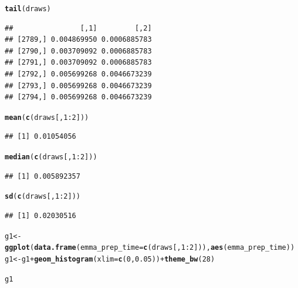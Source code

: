 \documentclass{article}\usepackage[]{graphicx}\usepackage[]{color}
\makeatletter
\newcommand{\hlnum}[1]{\textcolor[rgb]{0.686,0.059,0.569}{#1}}%
\newcommand{\hlopt}[1]{\textcolor[rgb]{0,0,0}{#1}}%
\newcommand{\hlstd}[1]{\textcolor[rgb]{0.345,0.345,0.345}{#1}}%
\newcommand{\hlkwb}[1]{\textcolor[rgb]{0.69,0.353,0.396}{#1}}%
\newcommand{\hlkwc}[1]{\textcolor[rgb]{0.333,0.667,0.333}{#1}}%
\newcommand{\hlkwd}[1]{\textcolor[rgb]{0.737,0.353,0.396}{\textbf{#1}}}%
\newenvironment{kframe}{%
 \def\at@end@of@kframe{}%
 \ifinner\ifhmode%
  \def\at@end@of@kframe{\end{minipage}}%
  \begin{minipage}{\columnwidth}%
 \fi\fi%
 \def\FrameCommand##1{\hskip\@totalleftmargin \hskip-\fboxsep
 \colorbox{shadecolor}{##1}\hskip-\fboxsep
     \hskip-\linewidth \hskip-\@totalleftmargin \hskip\columnwidth}%
 \MakeFramed {\advance\hsize-\width
   \@totalleftmargin\z@ \linewidth\hsize
   \@setminipage}}%
 {\par\unskip\endMakeFramed%
 \at@end@of@kframe}
\newenvironment{knitrout}{}{} %
\makeatother
\begin{document}
\begin{knitrout}
\color{fgcolor}\begin{kframe}
\begin{alltt}
\hlkwd{tail}\hlstd{(draws)}
\end{alltt}
\begin{verbatim}
##                [,1]         [,2]
## [2789,] 0.004869950 0.0006885783
## [2790,] 0.003709092 0.0006885783
## [2791,] 0.003709092 0.0006885783
## [2792,] 0.005699268 0.0046673239
## [2793,] 0.005699268 0.0046673239
## [2794,] 0.005699268 0.0046673239
\end{verbatim}
\begin{alltt}
\hlkwd{mean}\hlstd{(}\hlkwd{c}\hlstd{(draws[,} \hlnum{1}\hlopt{:}\hlnum{2}\hlstd{]))}
\end{alltt}
\begin{verbatim}
## [1] 0.01054056
\end{verbatim}
\begin{alltt}
\hlkwd{median}\hlstd{(}\hlkwd{c}\hlstd{(draws[,} \hlnum{1}\hlopt{:}\hlnum{2}\hlstd{]))}
\end{alltt}
\begin{verbatim}
## [1] 0.005892357
\end{verbatim}
\begin{alltt}
\hlkwd{sd}\hlstd{(}\hlkwd{c}\hlstd{(draws[,} \hlnum{1}\hlopt{:}\hlnum{2}\hlstd{]))}
\end{alltt}
\begin{verbatim}
## [1] 0.02030516
\end{verbatim}
\begin{alltt}
\hlstd{g1} \hlkwb{<-} \hlkwd{ggplot}\hlstd{(}\hlkwd{data.frame}\hlstd{(}\hlkwc{emma_prep_time} \hlstd{=} \hlkwd{c}\hlstd{(draws[,} \hlnum{1}\hlopt{:}\hlnum{2}\hlstd{])),} \hlkwd{aes}\hlstd{(emma_prep_time))}
\hlstd{g1} \hlkwb{<-} \hlstd{g1} \hlopt{+} \hlkwd{geom_histogram}\hlstd{(}\hlkwc{xlim} \hlstd{=} \hlkwd{c}\hlstd{(}\hlnum{0}\hlstd{,} \hlnum{0.05}\hlstd{))} \hlopt{+} \hlkwd{theme_bw}\hlstd{(}\hlnum{28}\hlstd{)}
\end{alltt}


{\ttfamily\noindent\color{warningcolor}{\#\# Warning: Ignoring unknown parameters: xlim}}\begin{alltt}
\hlstd{g1}
\end{alltt}



\end{kframe}
\end{knitrout}
\end{document}
